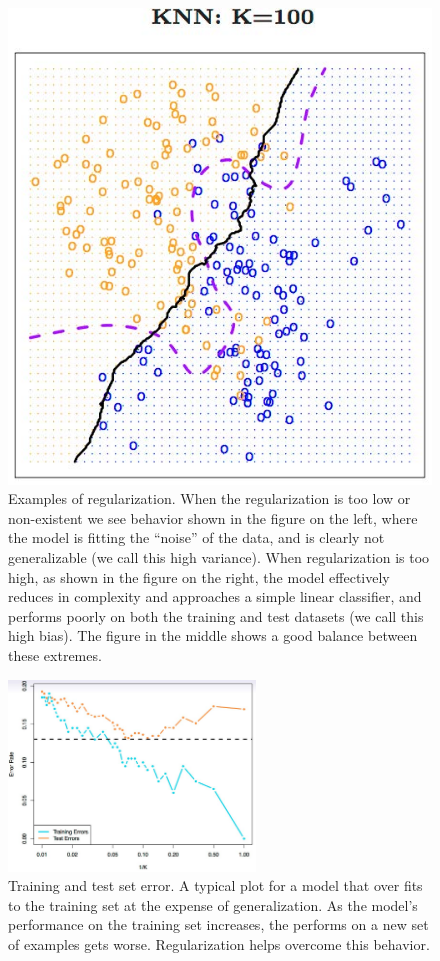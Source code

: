 \documentclass[twoside]{article}
\begin{document}
\begin{figure}[H]
\begin{minipage}[b]{0.25\textwidth}
  \end{minipage}
  \hfill
  \begin{minipage}[b]{0.25\textwidth}
    \includegraphics[width=\textwidth]{pics/lecture_8_knn_100.jpg}
  \end{minipage}
  \caption{Examples of regularization. When the regularization is too low or non-existent we see behavior shown in the figure on the left, where the model is fitting the ``noise'' of the data, and is clearly not generalizable (we call this high variance). When regularization is too high, as shown in the figure on the right, the model effectively reduces in complexity and approaches a simple linear classifier, and performs poorly on both the training and test datasets (we call this high bias). The figure in the middle shows a good balance between these extremes.}
\end{figure}

\begin{figure}[H]
\centering
\includegraphics[height = 2in]{pics/lecture_8_regularization_loss.jpg}
\caption{Training and test set error. A typical plot for a model that over fits to the training set at the expense of generalization. As the model's performance on the training set increases, the performs on a new set of examples gets worse. Regularization helps overcome this behavior.}
\end{figure}
\end{document}
